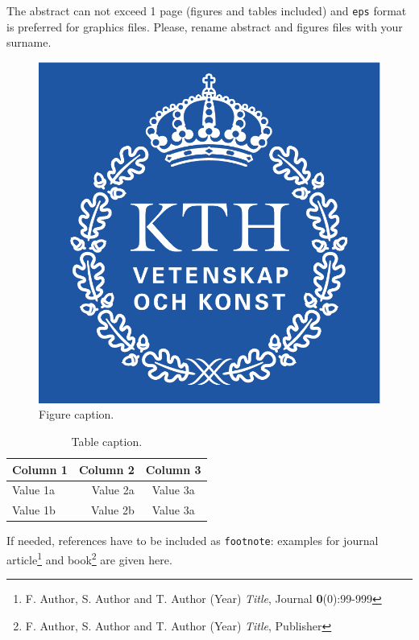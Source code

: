 % 
% 
% 
\begin{papers}


The abstract can not exceed 1 page (figures and tables included) and \texttt{eps} format is preferred for graphics files. Please, rename abstract and figures files with your surname.

\begin{figure}[!h]
  \centering
  \includegraphics[width=.5\textwidth]{surname-figurename}
  \caption{Figure caption.} \label{fig:surname-figurename}
\end{figure}

\begin{table}[!h]
  \centering
  \caption{Table caption.} \label{tab:surname-tablename}
  \begin{tabular}{lrc}
    \hline
    Column 1 & Column 2 & Column 3 \\[3pt]
    \hline
    Value 1a & Value 2a & Value 3a \\
    Value 1b & Value 2b & Value 3a \\
    \hline
  \end{tabular}
\end{table}

If needed, references have to be included as \texttt{footnote}: examples for journal article\footnote{F. Author, S. Author and T. Author (Year) \textit{Title}, Journal \textbf{0}(0):99-999} and book\footnote{F. Author, S. Author and T. Author (Year) \textit{Title}, Publisher} are given here.

\end{papers}
% 
